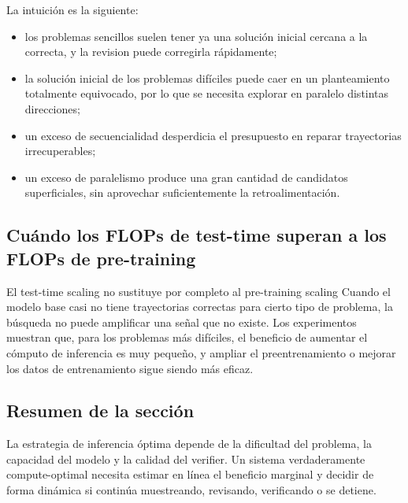 La intuición es la siguiente:

\begin{itemize}
    \item los problemas sencillos suelen tener ya una solución inicial cercana a la correcta, y la revision puede corregirla rápidamente;
    \item la solución inicial de los problemas difíciles puede caer en un planteamiento totalmente equivocado, por lo que se necesita explorar en paralelo distintas direcciones;
    \item un exceso de secuencialidad desperdicia el presupuesto en reparar trayectorias irrecuperables;
    \item un exceso de paralelismo produce una gran cantidad de candidatos superficiales, sin aprovechar suficientemente la retroalimentación.
\end{itemize}

\subsection{Cuándo los FLOPs de test-time superan a los FLOPs de pre-training}


\begin{importantbox}{El test-time scaling no sustituye por completo al pre-training scaling}
Cuando el modelo base casi no tiene trayectorias correctas para cierto tipo de problema, la búsqueda no puede amplificar una señal que no existe. Los experimentos muestran que, para los problemas más difíciles, el beneficio de aumentar el cómputo de inferencia es muy pequeño, y ampliar el preentrenamiento o mejorar los datos de entrenamiento sigue siendo más eficaz.
\end{importantbox}

\subsection{Resumen de la sección}

La estrategia de inferencia óptima depende de la dificultad del problema, la capacidad del modelo y la calidad del verifier. Un sistema verdaderamente compute-optimal necesita estimar en línea el beneficio marginal y decidir de forma dinámica si continúa muestreando, revisando, verificando o se detiene.
